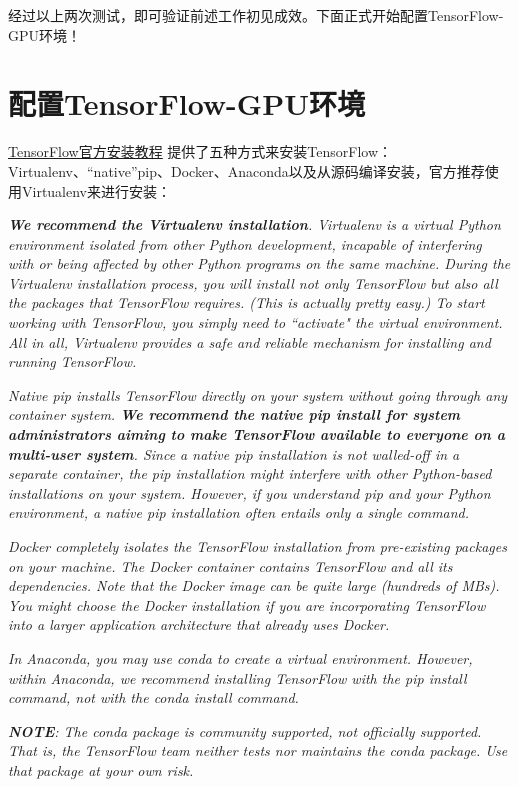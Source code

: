 \documentclass[11pt,a4paper]{ctexart}
\begin{document}
经过以上两次测试，即可验证前述工作初见成效。下面正式开始配置TensorFlow-GPU环境！


\section{配置TensorFlow-GPU环境}
\href{https://www.tensorflow.org/install/install_linux}{TensorFlow官方安装教程}
提供了五种方式来安装TensorFlow：Virtualenv、“native”pip、Docker、Anaconda以及从源码编译安装，官方推荐使用Virtualenv来进行安装：

\emph{{\textbf {We recommend the Virtualenv installation}}. Virtualenv is a virtual Python environment isolated from other Python development, incapable of interfering with or being affected by other Python programs on the same machine. During the Virtualenv installation process, you will install not only TensorFlow but also all the packages that TensorFlow requires. (This is actually pretty easy.) To start working with TensorFlow, you simply need to ``activate" the virtual environment. All in all, Virtualenv provides a safe and reliable mechanism for installing and running TensorFlow.}

\emph{Native pip installs TensorFlow directly on your system without going through any container system.{\textbf { We recommend the native pip install for system administrators aiming to make TensorFlow available to everyone on a multi-user system}}. Since a native pip installation is not walled-off in a separate container, the pip installation might interfere with other Python-based installations on your system. However, if you understand pip and your Python environment, a native pip installation often entails only a single command.}

\emph{Docker completely isolates the TensorFlow installation from pre-existing packages on your machine. The Docker container contains TensorFlow and all its dependencies. Note that the Docker image can be quite large (hundreds of MBs). You might choose the Docker installation if you are incorporating TensorFlow into a larger application architecture that already uses Docker.}

\emph{In Anaconda, you may use conda to create a virtual environment. However, within Anaconda, we recommend installing TensorFlow with the \emph{pip install} command, not with the \emph{conda install} command.}

\emph{{\textbf {NOTE}}: The conda package is community supported, not officially supported. That is, the TensorFlow team neither tests nor maintains the conda package. Use that package at your own risk.}
\end{document}
